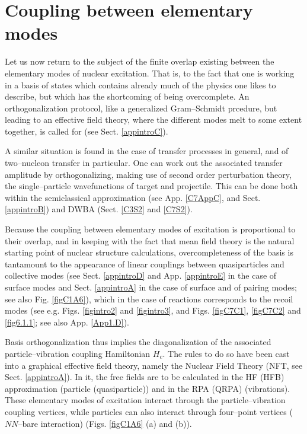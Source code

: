 \section{Coupling between elementary modes}\label{C1S4}
Let us now return to the subject of the finite overlap existing between the elementary modes of nuclear excitation. That is, to the fact that one is working in a basis of states which contains already much of the physics one likes to describe, but which has the shortcoming of being overcomplete. An orthogonalization protocol, like a generalized Gram--Schmidt prcedure, but leading to an effective field theory, where the different modes melt to some extent together, is called for (see Sect. \ref{appintroC}).

A similar situation is found in the case of transfer processes in general, and of two--nucleon transfer in particular. One can work out the associated transfer amplitude by orthogonalizing, making use of second order perturbation theory, the single--particle wavefunctions of target and projectile. This can be done both within the semiclassical approximation (see App. \ref{C7AppC}, and Sect. \ref{appintroB}) and DWBA (Sect. \ref{C3S2} and \ref{C7S2}). 

Because the coupling between elementary modes of excitation is proportional to their overlap, and in keeping with the fact that mean field theory is the natural starting point of nuclear structure calculations, overcompleteness of the basis is tantamount to the appearance of linear couplings between quasiparticles and collective modes (see Sect. \ref{appintroD} and App. \ref{appintroE} in the case of surface modes and Sect. \ref{appintroA} in the case of surface and of pairing modes; see also Fig. \ref{figC1A6}), which in the case of reactions corresponds to the recoil modes (see e.g. Figs. \ref{figintro2} and \ref{figintro3}, and Figs.  \ref{figC7C1}, \ref{figC7C2} and \ref{fig6.1.1}; see also App. \ref{App1.D}).


Basis orthogonalization thus implies the diagonalization of the associated particle--vibration coupling Hamiltonian $H_c$. The rules to do so have been cast into a graphical effective field theory, namely the Nuclear Field Theory (NFT, see Sect. \ref{appintroA}). In it, the free fields are to be calculated in the HF (HFB) approximation (particle (quasiparticle)) and in the RPA (QRPA) (vibrations). These elementary modes of excitation interact through the particle--vibration coupling vertices, while particles can also interact through four--point vertices ($NN$--bare interaction) (Figs. \ref{figC1A6} (a) and (b)).


